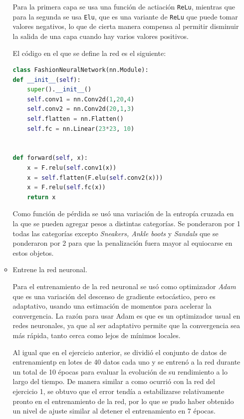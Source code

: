 \documentclass{article}
\begin{document}
\begin{enumerate}
\begin{itemize}
        Para la primera capa se usa una función de actiación \texttt{ReLu}, mientras
        que para la segunda se usa \texttt{Elu}, que es una variante de \texttt{ReLu}
        que puede tomar valores negativos, lo que de cierta manera compensa al permitir
        disminuir la salida de una capa cuando hay varios valores positivos. 

        El código en el que se define la red es el siguiente:

\begin{lstlisting}[language=Python]
class FashionNeuralNetwork(nn.Module):
def __init__(self):
    super().__init__()
    self.conv1 = nn.Conv2d(1,20,4)
    self.conv2 = nn.Conv2d(20,1,3)
    self.flatten = nn.Flatten()
    self.fc = nn.Linear(23*23, 10)


def forward(self, x):
    x = F.relu(self.conv1(x))
    x = self.flatten(F.elu(self.conv2(x)))
    x = F.relu(self.fc(x))
    return x\end{lstlisting}
            
        Como función de pérdida se usó una variación de la entropía cruzada en la
        que se pueden agregar pesos a distintas categorías. Se ponderaron por 1 todas
        las categorías excepto \textit{Sneakers, Ankle boots} y \textit{Sandals} que
        se ponderaron por 2 para que la penalización fuera mayor al equiocarse en estos
        objetos.
        

        \item Entrene la red neuronal.
        
        Para el entrenamiento de la red neuronal se usó como optimizador \textit{Adam} que
        es una variación del descenso de gradiente estocástico, pero es adaptativo, usando
        una estimación de momentos para acelerar la convergencia. La razón para usar Adam 
        es que es un optimizador usual en redes neuronales, ya que al ser adaptativo permite
        que la convergencia sea más rápida, tanto cerca como lejos de mínimos locales.

        Al igual que en el ejercicio anterior, se dividió el conjunto de datos de entrenamientp
        en lotes de 40 datos cada uno y se entrenó a la red durante un total de 10 épocas 
        para evaluar la evolución de su rendimiento a lo largo del tiempo. De manera
        similar a como ocurrió con la red del ejercicio 1, se obtuvo que el error tendía
        a estabilizarse relativamente pronto en el entrenamiento de la red, por lo que se pudo
        haber obtenido un nivel de ajuste similar al detener el entrenamiento en 7 épocas.



\end{itemize}
\end{enumerate}
\end{document}
